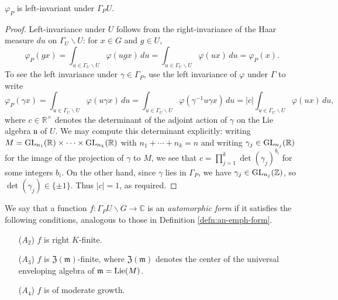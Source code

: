 \documentclass[reqno]{amsart} 
\begin{document}
\begin{lemma}
  $\varphi_P$ is left-invariant under $\Gamma_P U$.
\end{lemma}
\begin{proof}
  Left-invariance under $U$ follows from the right-invariance of the Haar measure $d u$ on $\Gamma_U \backslash U$: for $x \in G$ and $g \in U$,
  \begin{equation*}
    \varphi_P(g x) =
    \int _{u \in \Gamma_U \backslash U}
    \varphi(u g x) \, d u
    =
    \int _{u \in \Gamma_U \backslash U}
    \varphi(u x) \, d u
    = \varphi_P(x).
  \end{equation*}
  To see the left invariance under $\gamma \in \Gamma_P$, use the left invariance of $\varphi$ under $\Gamma$ to write
  \begin{equation*}
    \varphi_P(\gamma x)
    = \int _{u \in \Gamma_U \backslash U}
    \varphi(u \gamma x) \, d u
    = \int _{u \in \Gamma_U \backslash U}
    \varphi(\gamma^{-1} u \gamma x) \, d u
    =
    |c|
    \int _{u \in \Gamma_U \backslash U}
    \varphi(u x) \, d u,
  \end{equation*}
  where $c \in \mathbb{R}^\times$ denotes the determinant of the adjoint action of $\gamma$ on the Lie algebra $\mathfrak{u}$ of $U$.  We may compute this determinant explicitly: writing $M = \operatorname{GL}_{n_1}(\mathbb{R}) \times \dotsb \times \operatorname{GL}_{n_k}(\mathbb{R})$ with $n_1 + \dotsb + n_k = n$ and writing $\gamma_j \in \operatorname{GL}_{n_j}(\mathbb{R})$ for the image of the projection of $\gamma$ to $M$, we see that $c = \prod_{j=1}^k \det(\gamma_j)^{b_i}$ for some integers $b_i$.  On the other hand, since $\gamma$ lies in $\Gamma_P$, we have $\gamma_j \in \operatorname{GL}_{n_j}(\mathbb{Z})$, so $\det(\gamma_j) \in \{\pm 1\}$.  Thus $|c| = 1$, as required.
\end{proof}

\begin{definition}
  We say that a function $f : \Gamma_P U \backslash G \rightarrow \mathbb{C}$ is an \emph{automorphic form}
  if it satisfies the following conditions, analogous to those in Definition \ref{defn:an-emph-form}.
  \begin{enumerate}
  \item [($A_2$)] $f$ is right $K$-finite.
  \item [($A_3$)] $f$ is $\mathfrak{Z}(\mathfrak{m})$-finite, where $\mathfrak{Z}(\mathfrak{m})$ denotes the center of the universal enveloping algebra of $\mathfrak{m} = \operatorname{Lie}(M)$.
  \item [($A_4$)] $f$ is of moderate growth.
  \end{enumerate}
\end{definition}
\end{document}
